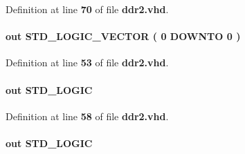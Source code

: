 Definition at line {\bf 70} of file {\bf ddr2.\+vhd}.

\paragraph[{mem\+\_\+odt}]{ {\bfseries \textcolor{keywordflow}{out}\textcolor{vhdlchar}{ }} {\bfseries \textcolor{comment}{S\+T\+D\+\_\+\+L\+O\+G\+I\+C\+\_\+\+V\+E\+C\+T\+OR}\textcolor{vhdlchar}{ }\textcolor{vhdlchar}{(}\textcolor{vhdlchar}{ }\textcolor{vhdlchar}{ } \textcolor{vhdldigit}{0} \textcolor{vhdlchar}{ }\textcolor{keywordflow}{D\+O\+W\+N\+TO}\textcolor{vhdlchar}{ }\textcolor{vhdlchar}{ } \textcolor{vhdldigit}{0} \textcolor{vhdlchar}{ }\textcolor{vhdlchar}{)}\textcolor{vhdlchar}{ }} \hspace{0.3cm}{\ttfamily [Port]}}\label{classddr2_a95035645a864ed754fadafcc327d8193}


Definition at line {\bf 53} of file {\bf ddr2.\+vhd}.

\paragraph[{mem\+\_\+ras\+\_\+n}]{ {\bfseries \textcolor{keywordflow}{out}\textcolor{vhdlchar}{ }} {\bfseries \textcolor{comment}{S\+T\+D\+\_\+\+L\+O\+G\+IC}\textcolor{vhdlchar}{ }} \hspace{0.3cm}{\ttfamily [Port]}}\label{classddr2_a66af27d2b7e4e52023322398b6717931}


Definition at line {\bf 58} of file {\bf ddr2.\+vhd}.

\paragraph[{mem\+\_\+we\+\_\+n}]{ {\bfseries \textcolor{keywordflow}{out}\textcolor{vhdlchar}{ }} {\bfseries \textcolor{comment}{S\+T\+D\+\_\+\+L\+O\+G\+IC}\textcolor{vhdlchar}{ }} \hspace{0.3cm}{\ttfamily [Port]}}\label{classddr2_a35033f28d92e7fd56a7a75dc0a10004e}


